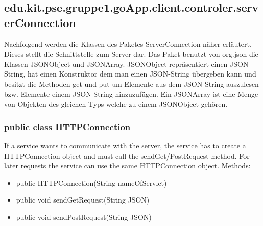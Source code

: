 \hypertarget{ServerConnection}{}
	\subsection{edu.kit.pse.gruppe1.goApp.client.controler.serverConnection}
	 	Nachfolgend werden die Klassen des Paketes ServerConnection näher erläutert.
 	Dieses stellt die Schnittstelle zum Server dar. Das Paket benutzt von org.json die Klassen JSONObject und JSONArray.
 	JSONObject repräsentiert einen JSON-String, hat einen Konstruktor dem man einen JSON-String übergeben kann und besitzt die Methoden get und put um Elemente aus dem JSON-String auszulesen bzw. Elemente einem JSON-String hinzuzufügen. 
 	Ein JSONArray ist eine Menge von Objekten des gleichen Typs welche zu einem JSONObject gehören.
 	
	\subsubsection{public class HTTPConnection}
If a service wants to communicate with the server, the service has to create a HTTPConnection object and must call the sendGet/PostRequest method.
For later requests the service can use the same HTTPConnection object.
\newline Methods:
\begin{itemize}
	\item public HTTPConnection(String nameOfServlet)
		
		\item public void sendGetRequest(String JSON)
		
		\item public void sendPostRequest(String JSON)
	\end{itemize}
	\hypertarget{JSONParameter}{}
